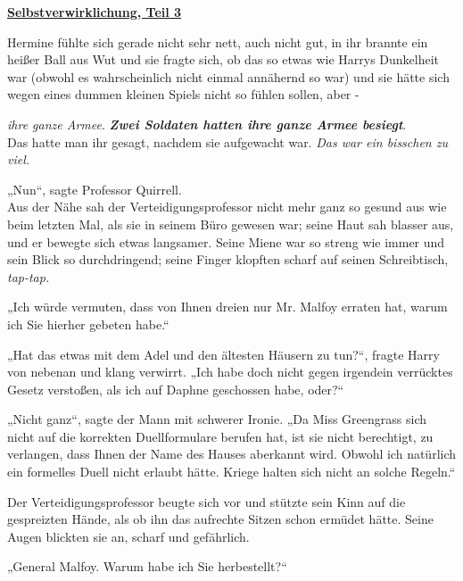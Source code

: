 

\hypertarget{selbstverwirklichung-teil-3}{%

\textbf{\uline{Selbstverwirklichung, Teil 3}}

\hfill\break Hermine fühlte sich gerade nicht sehr nett, auch nicht gut, in ihr brannte ein heißer Ball aus Wut und sie fragte sich, ob das so etwas wie Harrys Dunkelheit war (obwohl es wahrscheinlich nicht einmal annähernd so war) und sie hätte sich wegen eines dummen kleinen Spiels nicht so fühlen sollen, aber -

\emph{ihre ganze Armee}. \textbf{\emph{Zwei Soldaten hatten ihre ganze Armee besiegt}}.\\ Das hatte man ihr gesagt, nachdem sie aufgewacht war. \emph{Das war ein bisschen zu viel.}

„Nun“, sagte Professor Quirrell.\\ Aus der Nähe sah der Verteidigungsprofessor nicht mehr ganz so gesund aus wie beim letzten Mal, als sie in seinem Büro gewesen war; seine Haut sah blasser aus, und er bewegte sich etwas langsamer. Seine Miene war so streng wie immer und sein Blick so durchdringend; seine Finger klopften scharf auf seinen Schreibtisch, \emph{tap-tap.}

„Ich würde vermuten, dass von Ihnen dreien nur Mr. Malfoy erraten hat, warum ich Sie hierher gebeten habe.“

„Hat das etwas mit dem Adel und den ältesten Häusern zu tun?“, fragte Harry von nebenan und klang verwirrt. „Ich habe doch nicht gegen irgendein verrücktes Gesetz verstoßen, als ich auf Daphne geschossen habe, oder?“

„Nicht ganz“, sagte der Mann mit schwerer Ironie. „Da Miss Greengrass sich nicht auf die korrekten Duellformulare berufen hat, ist sie nicht berechtigt, zu verlangen, dass Ihnen der Name des Hauses aberkannt wird. Obwohl ich natürlich ein formelles Duell nicht erlaubt hätte. Kriege halten sich nicht an solche Regeln.“

Der Verteidigungsprofessor beugte sich vor und stützte sein Kinn auf die gespreizten Hände, als ob ihn das aufrechte Sitzen schon ermüdet hätte. Seine Augen blickten sie an, scharf und gefährlich.

„General Malfoy. Warum habe ich Sie herbestellt?“

}
